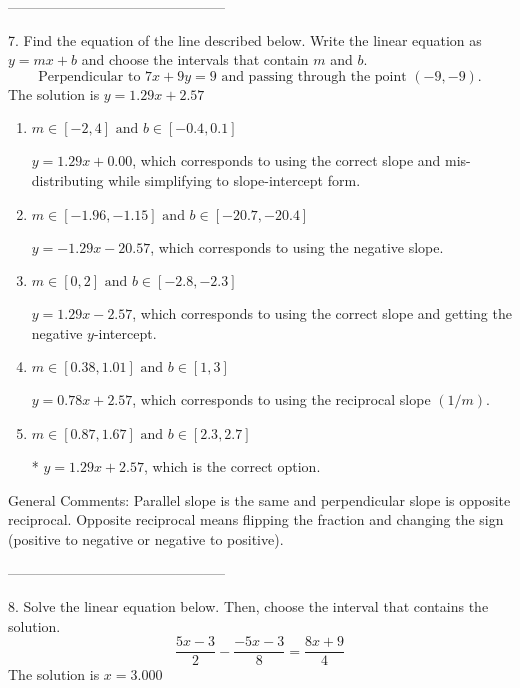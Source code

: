 \documentclass{extbook}[14pt]
\begin{document}
-----------------------------------------------

7. Find the equation of the line described below. Write the linear equation as $ y=mx+b $ and choose the intervals that contain $m$ and $b$.
\[ \text{Perpendicular to } 7 x + 9 y = 9 \text{ and passing through the point } (-9, -9). \] 
The solution is $ y = 1.29x + 2.57 $ 

\begin{enumerate}[label=\Alph*.] 
\item $ m \in [-2, 4] \text{ and } b \in [-0.4, 0.1] $ 

  $y = 1.29x + 0.00$, which corresponds to using the correct slope and mis-distributing while simplifying to slope-intercept form. 
\item $ m \in [-1.96, -1.15] \text{ and } b \in [-20.7, -20.4] $ 

  $y = -1.29x - 20.57$, which corresponds to using the negative slope. 
\item $ m \in [0, 2] \text{ and } b \in [-2.8, -2.3] $ 

  $y = 1.29x - 2.57$, which corresponds to using the correct slope and getting the negative $y$-intercept. 
\item $ m \in [0.38, 1.01] \text{ and } b \in [1, 3] $ 

  $y = 0.78x + 2.57$, which corresponds to using the reciprocal slope $(1/m)$. 
\item $ m \in [0.87, 1.67] \text{ and } b \in [2.3, 2.7] $ 

 * $y = 1.29x + 2.57$, which is the correct option. 
\end{enumerate} 
 
General Comments: Parallel slope is the same and perpendicular slope is opposite reciprocal. Opposite reciprocal means flipping the fraction and changing the sign (positive to negative or negative to positive).

-----------------------------------------------

8. Solve the linear equation below. Then, choose the interval that contains the solution.
\[ \frac{5 x - 3}{2} - \frac{-5 x - 3}{8} = \frac{8 x + 9}{4} \] 
The solution is $ x = 3.000 $ 
\end{document}

